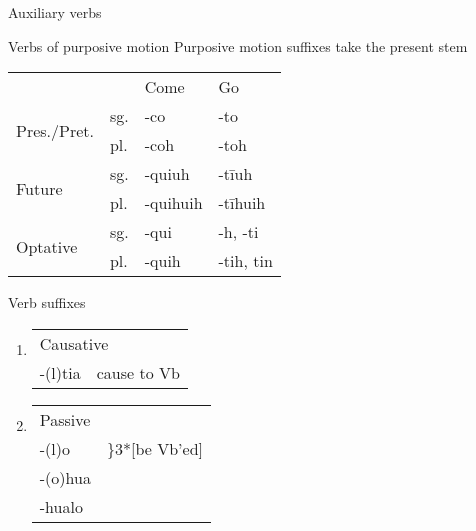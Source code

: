 \documentclass[12pt]{beamer}
\newcommand{\nah}[1]{\textcolor{nahgrn}{#1}}
\newcommand{\trs}[1]{\textcolor{nahblu}{#1}}
\begin{document}
\begin{frame}
\begin{columns}[t]
\begin{column}{.18\linewidth}
\begin{block}{Auxiliary verbs}
                      \end{block}
                      \begin{block}{Verbs of purposive motion}
                        Purposive motion suffixes take the present stem
                        \begin{tabular}{llll}
                          &     & \trs{Come}     & \trs{Go}          \\
                          \multirow{2}{*}{Pres./Pret.} & sg. & \nah{-co}      & \nah{-to}         \\
                          & pl. & \nah{-coh}     & \nah{-toh}        \\
                          \multirow{2}{*}{Future}       & sg. & \nah{-quiuh}   & \nah{-tīuh}       \\
                          & pl. & \nah{-quihuih} & \nah{-tīhuih}     \\
                          \multirow{2}{*}{Optative}  & sg. & \nah{-qui}     & \nah{-h,   -ti}   \\
                          & pl. & \nah{-quih}    & \nah{-tih,   tin} \\
                        \end{tabular}
                      \end{block}
                      \begin{block}{Verb suffixes}
                        \begin{enumerate}
                        \item 
                          \begin{tabular}[t]{ll}
                            \multicolumn{2}{l}{Causative}\\
                            \nah{-(l)tia} & \trs{cause to Vb}
                          \end{tabular}
                        \item
                          \begin{tabular}[t]{ll}
                            \multicolumn{2}{l}{Passive}\\
                            \nah{-(l)o} & \trs{\hspace{-1em}\rdelim\}{3}{*}[be Vb'ed]}\\
                            \nah{-(o)hua} & \\
                            \nah{-hualo} & \\
                          \end{tabular}

\end{enumerate}
\end{block}
\end{column}
\end{columns}
\end{frame}
\end{document}
